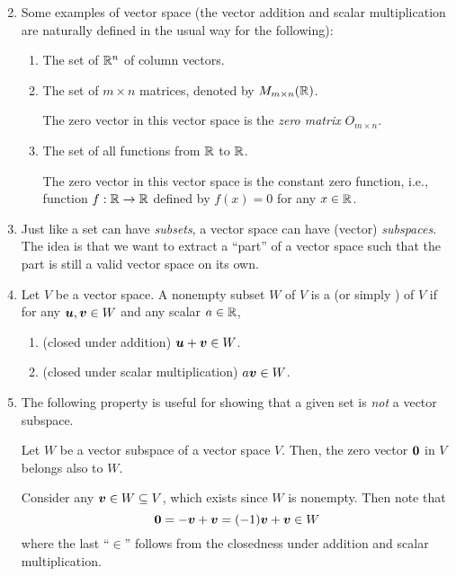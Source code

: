 \begin{enumerate}
\begin{pf}
\begin{enumerate}
\[\]
\end{enumerate}
\end{pf}
\item Some examples of vector space (the vector addition and scalar
multiplication are naturally defined in the usual way for the following):
\begin{enumerate}
\item The set of \(\mathbb{R}^n\) of column vectors.
\item The set of \(m\times n\) matrices, denoted by \(M_{m\times n}(\mathbb{R})\).
\begin{note}
The zero vector in this vector space is the \emph{zero matrix} \(O_{m\times n}\).
\end{note}
\item The set of all functions from \(\mathbb{R}\) to \(\mathbb{R}\).
\begin{note}
The zero vector in this vector space is the constant zero function, i.e.,
function \(f:\mathbb{R} \to\mathbb{R}\) defined by \(f(x)=0\) for any \(x\in\mathbb{R}\).
\end{note}
\end{enumerate}
\item Just like a set can have \emph{subsets}, a vector space can have (vector)
\emph{subspaces}. The idea is that we want to extract a ``part'' of a vector
space such that the part is still a valid vector space on its own.

\item Let \(V\) be a vector space. A nonempty subset \(W\) of \(V\) is a
 (or simply ) of \(V\) if for any
\(\vb*{u},\vb*{v}\in W\) and any scalar \(a\in\mathbb{R}\),
\begin{enumerate}
\item (closed under addition) \(\vb*{u}+\vb*{v}\in W\).
\item (closed under scalar multiplication) \(a\vb*{v}\in W\).
\end{enumerate}
\item The following property is useful for showing that a given set is
\emph{not} a vector subspace.
\begin{proposition}
\label{prp:vec-subsp-contain-zero}
Let \(W\) be a vector subspace of a vector space \(V\). Then, the zero vector
\(\vb*{0}\) in \(V\) belongs also to \(W\).
\end{proposition}
\begin{pf}
Consider any \(\vb*{v}\in W\subseteq V\), which exists since \(W\) is
nonempty. Then note that
\[
\vb*{0}=-\vb*{v}+\vb*{v}=(-1)\vb*{v}+\vb*{v}\in W
\]
where the last ``\(\in\)'' follows from the closedness under addition and
scalar multiplication.
\end{pf}


\end{enumerate}
